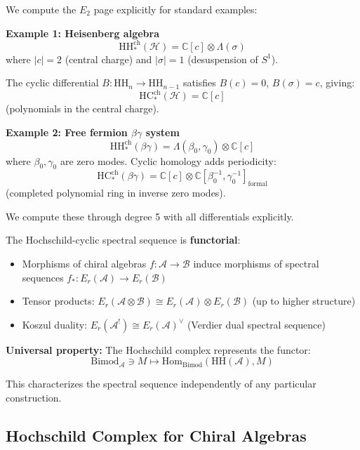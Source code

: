\begin{computation}
We compute the $E_2$ page explicitly for standard examples:

\textbf{Example 1: Heisenberg algebra}
$$\text{HH}_*^{\text{ch}}(\mathcal{H}) = \mathbb{C}[c] \otimes \Lambda(\sigma)$$
where $|c| = 2$ (central charge) and $|\sigma| = 1$ (desuspension of $S^1$).

The cyclic differential $B: \text{HH}_n \to \text{HH}_{n-1}$ satisfies $B(c) = 0$, 
$B(\sigma) = c$, giving:
$$\text{HC}_*^{\text{ch}}(\mathcal{H}) = \mathbb{C}[c]$$
(polynomials in the central charge).

\textbf{Example 2: Free fermion $\beta\gamma$ system}
$$\text{HH}_*^{\text{ch}}(\beta\gamma) = \Lambda(\beta_0, \gamma_0) \otimes \mathbb{C}[c]$$
where $\beta_0, \gamma_0$ are zero modes. Cyclic homology adds periodicity:
$$\text{HC}_*^{\text{ch}}(\beta\gamma) = \mathbb{C}[c] \otimes 
   \mathbb{C}[\beta_0^{-1}, \gamma_0^{-1}]_{\text{formal}}$$
(completed polynomial ring in inverse zero modes).

We compute these through degree 5 with all differentials explicitly.
\end{computation}

\begin{principle}
The Hochschild-cyclic spectral sequence is \textbf{functorial}:
\begin{itemize}
\item Morphisms of chiral algebras $f: \mathcal{A} \to \mathcal{B}$ induce morphisms 
of spectral sequences $f_*: E_r(\mathcal{A}) \to E_r(\mathcal{B})$
\item Tensor products: $E_r(\mathcal{A} \otimes \mathcal{B}) \cong 
   E_r(\mathcal{A}) \otimes E_r(\mathcal{B})$ (up to higher structure)
\item Koszul duality: $E_r(\mathcal{A}^!) \cong E_r(\mathcal{A})^\vee$ 
   (Verdier dual spectral sequence)
\end{itemize}

\textbf{Universal property:} The Hochschild complex represents the functor:
$$\text{Bimod}_{\mathcal{A}} \ni M \mapsto \text{Hom}_{\text{Bimod}}(\text{HH}(\mathcal{A}), M)$$

This characterizes the spectral sequence independently of any particular construction.
\end{principle}

\subsection{Hochschild Complex for Chiral Algebras}

